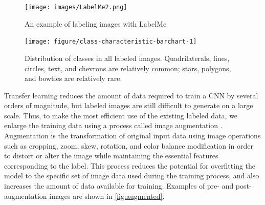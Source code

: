 \documentclass{article}\usepackage[]{graphicx}\usepackage[table]{xcolor}
\newenvironment{knitrout}{}{} %
\begin{document}
\begin{figure}[hbt]
\centering
\texttt{[image: images/LabelMe2.png]}
\caption{An example of labeling images with LabelMe}
\end{figure}

\begin{knitrout}
\color{fgcolor}\begin{figure}

{\centering \texttt{[image: figure/class-characteristic-barchart-1]} 

}

\caption[Distribution of classes in all labeled images.]{Distribution of classes in all labeled images. Quadrilaterals, lines, circles, text, and chevrons are relatively common; stars, polygons, and bowties are relatively rare.}\label{fig:class-characteristic-barchart}
\end{figure}


\end{knitrout}

Transfer learning reduces the amount of data required to train a CNN by several orders of magnitude, but labeled images are still difficult to generate on a large scale. Thus, to make the most efficient use of the existing labeled data, we enlarge the training data using a process called image augmentation \citep{krizhevskyImageNetClassificationDeep2012}. Augmentation is the transformation of original input data using image operations such as cropping, zoom, skew, rotation, and color balance modification in order to distort or alter the image while maintaining the essential features corresponding to the label. This process reduces the potential for overfitting the model to the specific set of image data used during the training process, and also increases the amount of data available for training. Examples of pre- and post-augmentation images are shown in \autoref{fig:augmented}.
\end{document}
